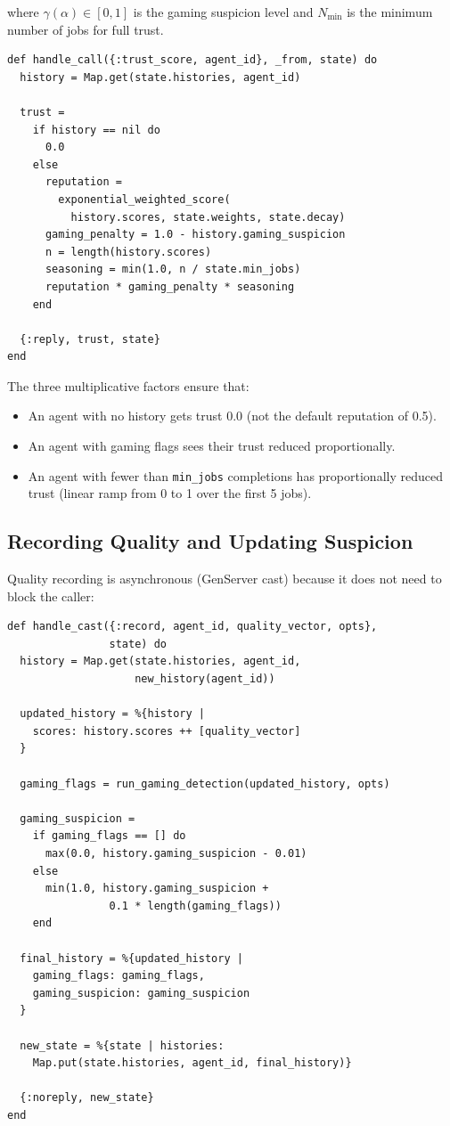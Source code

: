 \documentclass[12pt,a4paper]{article}
\theoremstyle{plain}
\theoremstyle{definition}
\begin{document}
where $\gamma(\alpha) \in [0, 1]$ is the gaming suspicion level and $N_{\min}$ is the minimum number of jobs for full trust.

\begin{lstlisting}[caption={Trust score computation},label={lst:rep-trust}]
def handle_call({:trust_score, agent_id}, _from, state) do
  history = Map.get(state.histories, agent_id)

  trust =
    if history == nil do
      0.0
    else
      reputation =
        exponential_weighted_score(
          history.scores, state.weights, state.decay)
      gaming_penalty = 1.0 - history.gaming_suspicion
      n = length(history.scores)
      seasoning = min(1.0, n / state.min_jobs)
      reputation * gaming_penalty * seasoning
    end

  {:reply, trust, state}
end
\end{lstlisting}

The three multiplicative factors ensure that:
\begin{itemize}
    \item An agent with no history gets trust 0.0 (not the default reputation of 0.5).
    \item An agent with gaming flags sees their trust reduced proportionally.
    \item An agent with fewer than \texttt{min\_jobs} completions has proportionally reduced trust (linear ramp from 0 to 1 over the first 5 jobs).
\end{itemize}

\subsection{Recording Quality and Updating Suspicion}

Quality recording is asynchronous (GenServer cast) because it does not need to block the caller:

\begin{lstlisting}[caption={Quality recording with gaming detection},label={lst:rep-record}]
def handle_cast({:record, agent_id, quality_vector, opts},
                state) do
  history = Map.get(state.histories, agent_id,
                    new_history(agent_id))

  updated_history = %{history |
    scores: history.scores ++ [quality_vector]
  }

  gaming_flags = run_gaming_detection(updated_history, opts)

  gaming_suspicion =
    if gaming_flags == [] do
      max(0.0, history.gaming_suspicion - 0.01)
    else
      min(1.0, history.gaming_suspicion +
                0.1 * length(gaming_flags))
    end

  final_history = %{updated_history |
    gaming_flags: gaming_flags,
    gaming_suspicion: gaming_suspicion
  }

  new_state = %{state | histories:
    Map.put(state.histories, agent_id, final_history)}

  {:noreply, new_state}
end
\end{lstlisting}
\end{document}
